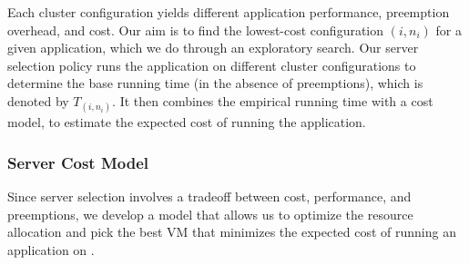 Each cluster configuration yields different application performance, preemption overhead, and cost.
Our aim is to find the lowest-cost configuration $(i, n_i)$ for a given application, which we do through an exploratory search. 
Our server selection policy runs the application on different cluster configurations to determine the base running time (in the absence of preemptions), which is denoted by $T_{(i,n_i)}$. 
It then combines the empirical running time with a cost model, to estimate the expected cost of running the application. 

\vspace*{\subsecspace}
\subsubsection{Server Cost Model}
\label{subsec:cost-model}

Since server selection involves a tradeoff between cost, performance, and preemptions, we develop a model that allows us to optimize the resource allocation and pick the best VM that minimizes the expected cost of running an application on \sysname. 




